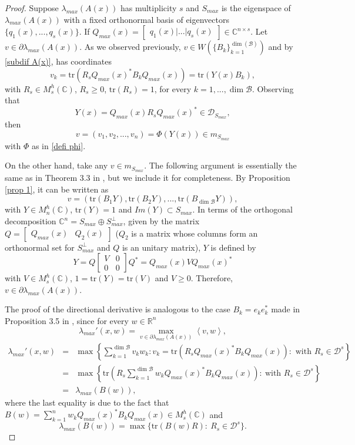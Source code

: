 \documentclass[12pt,a4paper]{article}
\def\calB{\mathcal B}
\def\calD{\mathcal D}
\def\R{\mathbb R}
\def\C{\mathbb C}
\def\tr{\text{tr}}
\numberwithin{equation}{section}
\begin{document}
\begin{proof}
	Suppose $\lambda_{max}(A(x))$ has multiplicity $s$ and $S_{max}$ is the eigenspace of $\lambda_{max}(A(x))$ with a fixed orthonormal basis of eigenvectors $\{q_1(x),...,q_s(x)\}$. If $Q_{max}(x)=\begin{bmatrix}
		q_1(x)|...|q_s(x)
	\end{bmatrix}\in \C^{n\times s}$. Let $v\in\partial\lambda_{max}(A(x))$. As we observed previously,  $v\in W\left(\{B_k\}_{k=1}^{\dim(\calB)} \right)$ and  by \eqref{subdif A(x)},  has coordinates
	$$v_k=\tr \left( R_s Q_{max}(x)^*B_kQ_{max}(x)\right)=\tr \left(Y(x)B_k\right),$$ 
	with $R_s\in M_s^h(\C)$, $R_s\geq 0$, $\tr(R_s)=1$, for every $k=1,...,\dim{\calB}$. Observing that \[Y(x)=Q_{max}(x)R_s Q_{max}(x)^*\in\mathcal{D}_{S_{max}},\] 
	then
	 \[v=(v_1,v_2,...,v_n)=\Phi(Y(x))\in m_{S_{max}}\] 
	with $\Phi$ as in \eqref{defi phi}.
	
	On the other hand, take any $v\in m_{S_{max}}$.  The following argument is essentially the same as in Theorem 3.3 in \cite{BV-SDP}, but we include it for completeness. By Proposition \ref{prop 1}, it can be written as
	$$
	v=\left( \tr(B_1Y), \tr(B_2Y), ...,\tr(B_{\dim{\calB}}Y) \right), $$
	with $Y\in M_n^h(\C)$, $\tr(Y)=1$ and $Im(Y)\subset S_{max}$.
	In terms of the orthogonal decomposition $\C^n=S_{max}\oplus S_{max}^{\perp}$, given by the matrix $Q=\begin{bmatrix}
		Q_{max}(x)&Q_2(x)
	\end{bmatrix}$ ($Q_2$ is a matrix whose columns form an orthonormal set for $S_{max}^{\perp}$ and $Q$ is an unitary matrix), $Y$ is defined by
	$$Y=Q\begin{bmatrix}
		V&0\\
		0&0
	\end{bmatrix}Q^*=Q_{max}(x)VQ_{max}(x)^*$$
	with $V\in M_s^h(\C)$, $1=\tr(Y)=\tr(V)$ and $V\geq 0$. Therefore, $v\in \partial \lambda_{max}(A(x))$.
	
	The proof of the directional derivative is analogous to the case $B_k=e_ke_k^*$ made in Proposition 3.5 in \cite{BV-SDP}, since for every $w\in \R^n$ 
	\[\lambda_{max}'(x,w)=\max_{v\in \partial \lambda_{max}(A(x))} \left\langle v,w\right\rangle,\]
		\begin{eqnarray*}
		\lambda_{max}'(x,w)&=&\max\left\lbrace \sum_{k=1}^{\dim{\calB}} v_kw_k: v_k=\tr\left( R_s Q_{max}(x)^*B_kQ_{max}(x)\right): \text{ with } R_s\in \calD^s\right\rbrace\\
		&=&\max\left\lbrace  \tr\left(  R_s\sum_{k=1}^{\dim{\calB}}w_k Q_{max}(x)^*B_kQ_{max}(x)\right) :\ \text{with } R_s\in \calD^s\right\rbrace\\
		&=&\lambda_{max}(B(w)),
	\end{eqnarray*} 
	where the last equality  is due to the fact that $B(w)=\sum_{k=1}^{n}w_kQ_{max}(x)^*B_kQ_{max}(x)\in M_s^{h}(\C)$ and
	\begin{equation} \label{ray mat}
		\lambda_{max}(B(w))=\max \{\tr(B(w)R):\ R_s\in \calD^s\}. 
	\end{equation}
	
	
\end{proof}
\end{document}

